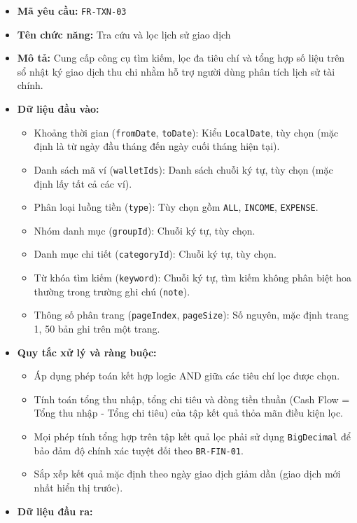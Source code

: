 \documentclass[11pt,a4paper]{article}
\providecommand{\tightlist}{
  \setlength{\itemsep}{0pt}\setlength{\parskip}{0pt}}
\begin{document}
\begin{itemize}
\tightlist
\item
  \textbf{Mã yêu cầu:} \texttt{FR-TXN-03}
\item
  \textbf{Tên chức năng:} Tra cứu và lọc lịch sử giao dịch
\item
  \textbf{Mô tả:} Cung cấp công cụ tìm kiếm, lọc đa tiêu chí và tổng hợp
  số liệu trên sổ nhật ký giao dịch thu chi nhằm hỗ trợ người dùng phân
  tích lịch sử tài chính.
\item
  \textbf{Dữ liệu đầu vào:}

  \begin{itemize}
  \tightlist
  \item
    Khoảng thời gian (\texttt{fromDate}, \texttt{toDate}): Kiểu
    \texttt{LocalDate}, tùy chọn (mặc định là từ ngày đầu tháng đến ngày
    cuối tháng hiện tại).
  \item
    Danh sách mã ví (\texttt{walletIds}): Danh sách chuỗi ký tự, tùy
    chọn (mặc định lấy tất cả các ví).
  \item
    Phân loại luồng tiền (\texttt{type}): Tùy chọn gồm \texttt{ALL},
    \texttt{INCOME}, \texttt{EXPENSE}.
  \item
    Nhóm danh mục (\texttt{groupId}): Chuỗi ký tự, tùy chọn.
  \item
    Danh mục chi tiết (\texttt{categoryId}): Chuỗi ký tự, tùy chọn.
  \item
    Từ khóa tìm kiếm (\texttt{keyword}): Chuỗi ký tự, tìm kiếm không
    phân biệt hoa thường trong trường ghi chú (\texttt{note}).
  \item
    Thông số phân trang (\texttt{pageIndex}, \texttt{pageSize}): Số
    nguyên, mặc định trang 1, 50 bản ghi trên một trang.
  \end{itemize}
\item
  \textbf{Quy tắc xử lý và ràng buộc:}

  \begin{itemize}
  \tightlist
  \item
    Áp dụng phép toán kết hợp logic AND giữa các tiêu chí lọc được chọn.
  \item
    Tính toán tổng thu nhập, tổng chi tiêu và dòng tiền thuần (Cash Flow
    = Tổng thu nhập - Tổng chi tiêu) của tập kết quả thỏa mãn điều kiện
    lọc.
  \item
    Mọi phép tính tổng hợp trên tập kết quả lọc phải sử dụng
    \texttt{BigDecimal} để bảo đảm độ chính xác tuyệt đối theo
    \texttt{BR-FIN-01}.
  \item
    Sắp xếp kết quả mặc định theo ngày giao dịch giảm dần (giao dịch mới
    nhất hiển thị trước).
  \end{itemize}
\item
  \textbf{Dữ liệu đầu ra:}


\end{itemize}
\end{document}
